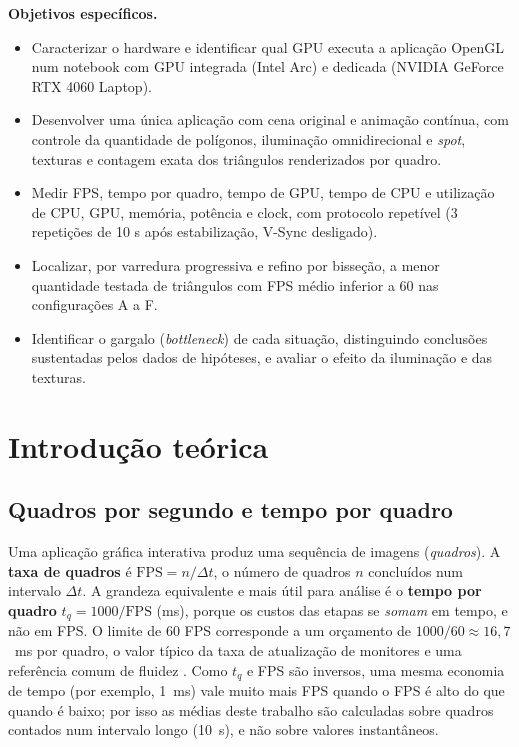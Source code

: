 \documentclass[12pt,a4paper]{article}
\begin{document}
\noindent\textbf{Objetivos específicos.}
\begin{itemize}
  \item Caracterizar o hardware e identificar qual GPU executa a aplicação OpenGL num
        notebook com GPU integrada (Intel Arc) e dedicada (NVIDIA GeForce RTX 4060 Laptop).
  \item Desenvolver uma única aplicação com cena original e animação contínua, com controle
        da quantidade de polígonos, iluminação omnidirecional e \emph{spot}, texturas e
        contagem exata dos triângulos renderizados por quadro.
  \item Medir FPS, tempo por quadro, tempo de GPU, tempo de CPU e utilização de CPU, GPU,
        memória, potência e clock, com protocolo repetível (3 repetições de 10 s após
        estabilização, V-Sync desligado).
  \item Localizar, por varredura progressiva e refino por bisseção, a menor quantidade testada
        de triângulos com FPS médio inferior a 60 nas configurações A a F.
  \item Identificar o gargalo (\emph{bottleneck}) de cada situação, distinguindo conclusões
        sustentadas pelos dados de hipóteses, e avaliar o efeito da iluminação e das texturas.
\end{itemize}

\section{Introdução teórica}

\subsection{Quadros por segundo e tempo por quadro}

Uma aplicação gráfica interativa produz uma sequência de imagens (\emph{quadros}). A
\textbf{taxa de quadros} é $\text{FPS} = n/\Delta t$, o número de quadros $n$ concluídos num
intervalo $\Delta t$. A grandeza equivalente e mais útil para análise é o \textbf{tempo por
quadro} $t_q = 1000/\text{FPS}$ (ms), porque os custos das etapas se \emph{somam} em tempo, e
não em FPS. O limite de 60 FPS corresponde a um orçamento de $1000/60 \approx 16{,}7$~ms por
quadro, o valor típico da taxa de atualização de monitores e uma referência comum de fluidez
\cite{akenine}. Como $t_q$ e FPS são inversos, uma mesma economia de tempo (por exemplo,
1~ms) vale muito mais FPS quando o FPS é alto do que quando é baixo; por isso as médias deste
trabalho são calculadas sobre quadros contados num intervalo longo (10~s), e não sobre valores
instantâneos.
\end{document}
